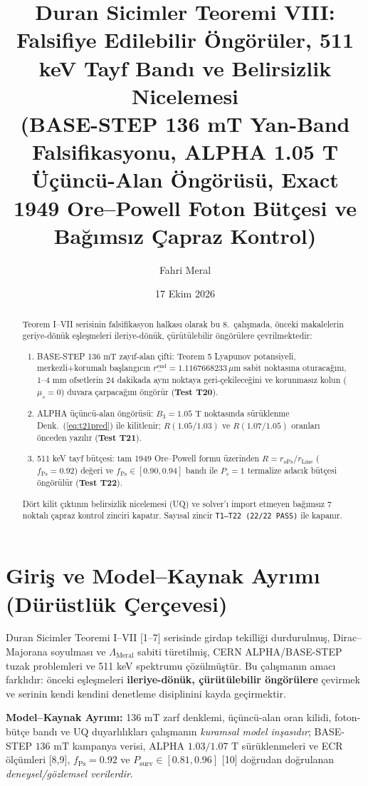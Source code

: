 \documentclass[12pt,a4paper]{article}
\title{\textbf{Duran Sicimler Teoremi VIII: Falsifiye Edilebilir Öngörüler, 511 keV Tayf Bandı ve Belirsizlik Nicelemesi} \\[0.3cm]
\large (BASE-STEP 136 mT Yan-Band Falsifikasyonu, ALPHA 1.05 T Üçüncü-Alan Öngörüsü, Exact 1949 Ore--Powell Foton Bütçesi ve Bağımsız Çapraz Kontrol)}
\author{Fahri Meral}
\date{17 Ekim 2026}
\begin{document}
\shorthandoff{=}

\maketitle

\begin{abstract}
Teorem I--VII serisinin falsifikasyon halkası olarak bu 8.\ çalışmada, önceki makalelerin geriye-dönük eşleşmeleri ileriye-dönük, çürütülebilir öngörülere çevrilmektedir:
\begin{enumerate}
    \item BASE-STEP 136 mT zayıf-alan çifti: Teorem 5 Lyapunov potansiyeli, merkezli+korumalı başlangıcın $r_-^{\mathrm{end}} = 1.1167668233\,\mu\text{m}$ sabit noktasına oturacağını, $1$--$4\text{ mm}$ ofsetlerin 24 dakikada aynı noktaya geri-çekileceğini ve korunmasız kolun ($\mu_s=0$) duvara çarpacağını öngörür (\textbf{Test T20}).
    \item ALPHA üçüncü-alan öngörüsü: $B_3=1.05\text{ T}$ noktasında sürüklenme Denk.\ (\ref{eq:t21pred}) ile kilitlenir; $R(1.05/1.03)$ ve $R(1.07/1.05)$ oranları önceden yazılır (\textbf{Test T21}).
    \item 511 keV tayf bütçesi: tam 1949 Ore--Powell formu üzerinden $R = r_{\mathrm{oPs}}/r_{\mathrm{Line}}$ ($f_{\mathrm{Ps}}=0.92$) değeri ve $f_{\mathrm{Ps}}\in[0.90,0.94]$ bandı ile $P_s=1$ termalize adacık bütçesi öngörülür (\textbf{Test T22}).
\end{enumerate}
Dört kilit çıktının belirsizlik nicelemesi (UQ) ve solver'ı import etmeyen bağımsız 7 noktalı çapraz kontrol zinciri kapatır. Sayısal zincir \texttt{T1--T22 (22/22 PASS)} ile kapanır.
\end{abstract}

\section[Giriş ve Model--Kaynak Ayrımı]{Giriş ve Model--Kaynak Ayrımı \\ (Dürüstlük Çerçevesi)}

Duran Sicimler Teoremi I--VII [1--7] serisinde girdap tekilliği durdurulmuş, Dirac--Majorana soyulması ve $\Lambda_{\mathrm{Meral}}$ sabiti türetilmiş, CERN ALPHA/BASE-STEP tuzak problemleri ve 511 keV spektrumu çözülmüştür. Bu çalışmanın amacı farklıdır: önceki eşleşmeleri \textbf{ileriye-dönük, çürütülebilir öngörülere} çevirmek ve serinin kendi kendini denetleme disiplinini kayda geçirmektir.

\textbf{Model--Kaynak Ayrımı:} 136 mT zarf denklemi, üçüncü-alan oran kilidi, foton-bütçe bandı ve UQ duyarlılıkları çalışmanın \textit{kuramsal model inşasıdır}; BASE-STEP $136\text{ mT}$ kampanya verisi, ALPHA $1.03/1.07\text{ T}$ sürüklenmeleri ve ECR ölçümleri [8,9], $f_{\mathrm{Ps}}=0.92$ ve $P_{\mathrm{surv}}\in[0.81,0.96]$ [10] doğrudan doğrulanan \textit{deneysel/gözlemsel verilerdir}.
\end{document}
